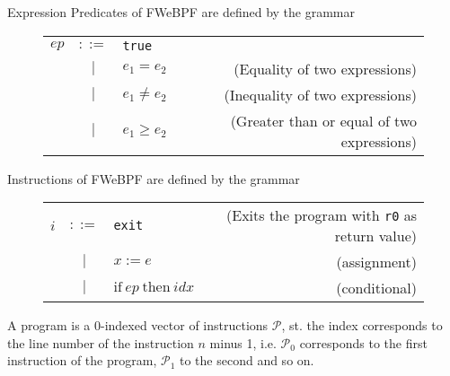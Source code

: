 Expression Predicates of FWeBPF are defined by the grammar
\begin{figure}[H]
  \centering
  \begin{tabular}{lclr}
    $ep$ & $::=$ & \texttt{true} & \\
     & $|$ & $e_1 = e_2$ & (Equality of two expressions) \\    
     & $|$ & $e_1 \neq e_2$ & (Inequality of two expressions) \\
     & $|$ &  $e_1 \geq e_2$ & (Greater than or equal of two expressions) \\
\end{tabular}    
\end{figure}


Instructions of FWeBPF are defined by the grammar
\begin{figure}[H]
  \centering
  \begin{tabular}{lclr}
    $i$ & $::=$ & \texttt{exit} & (Exits the program with \texttt{r0} as return value) \\
        & $|$   & $x := e$      & (assignment) \\
        & $|$   & $\mathrm{if} ~ ep ~ \mathrm{then} ~ idx$ & (conditional) \\ %
\end{tabular}    
\end{figure}



A program is a 0-indexed vector of instructions $\mathcal{P}$, st. the index corresponds to the line number of the instruction $n$ minus 1, i.e. $\mathcal{P}_0$ corresponds to the first instruction of the program, $\mathcal{P}_1$ to the second and so on.

